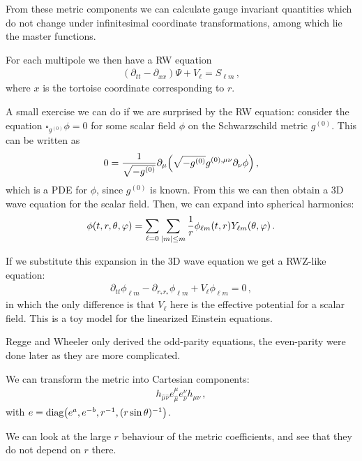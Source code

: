 \documentclass[main.tex]{subfiles}
\begin{document}
From these metric components we can calculate gauge invariant quantities which do not change under infinitesimal coordinate transformations, among which lie the master functions. 

For each multipole we then have a RW equation 
%
\begin{align}
(\partial_{tt} - \partial_{xx}) \Psi + V_\ell = S_{\ell m}
\,,
\end{align}
%
where \(x\) is the tortoise coordinate corresponding to \(r\). 

A small exercise we can do if we are surprised by the RW equation: consider the equation \(\square_{g^{(0)}} \phi = 0\) for some scalar field \(\phi \) on the Schwarzschild metric \(g^{(0)}\).
This can be written as 
%
\begin{align}
0 = \frac{1}{\sqrt{-g^{(0)}}} \partial_{\mu } 
\qty( \sqrt{-g^{(0)}} g^{(0), \mu \nu } \partial_{\nu } \phi  )
\,,
\end{align}
%
which is a PDE for \(\phi \), since \(g^{(0)}\) is known. 
From this we can then obtain a 3D wave equation for the scalar field. 
Then, we can expand into spherical harmonics: 
%
\begin{align}
\phi (t, r, \theta , \varphi ) = \sum _{\ell=0} \sum _{\abs{m} \leq m} \frac{1}{r} \phi_{\ell m} (t, r) Y_{\ell m} (\theta , \varphi )
\,.
\end{align}
%

If we substitute this expansion in the 3D wave equation we get a RWZ-like equation: 
%
\begin{align}
\partial_{tt} \phi_{\ell m } - \partial_{r_* r_*} \phi_{\ell m} + V_\ell \phi_{\ell m} = 0 
\,,
\end{align}
%
in which the only difference is that \(V_\ell\) here is the effective potential for a scalar field. 
This is a toy model for the linearized Einstein equations. 

Regge and Wheeler only derived the odd-parity equations, the even-parity were done later as they are more complicated.

We can transform the metric into Cartesian components: 
%
\begin{align}
h_{\hat{\mu} \hat{\nu}} e^{\mu }_{\hat{\mu}} e^{\nu }_{\hat{\nu}} h_{\mu \nu }  
\,,
\end{align}
%
with \(e = \text{diag}\qty(e^{a}, e^{-b}, r^{-1}, (r \sin \theta )^{-1} )\).

We can look at the large \(r\) behaviour of the metric coefficients, and see that they do not depend on \(r\) there. 
\end{document}
